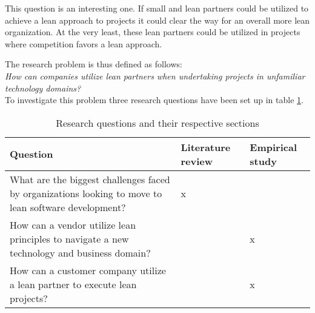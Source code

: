 This question is an interesting one. If small and lean partners could be utilized to achieve a lean approach to projects it could clear the way for an overall more lean organization. At the very least, these lean partners could be utilized in projects where competition favors a lean approach.

The research problem is thus defined as follows:\\

\textit{How can companies utilize lean partners when undertaking projects in unfamiliar technology domains?}\\

To investigate this problem three research questions have been set up in table \ref{tbl:questions}.


\begin{table}
  \begin{tabular}{p{200pt} | p{70pt} | p{70pt}}
    Question & Literature review & Empirical study \\
    \hline
    What are the biggest challenges faced by organizations looking to move to lean software development? & x & \\
    How can a vendor utilize lean principles to navigate a new technology and business domain? &  & x \\
    How can a customer company utilize a lean partner to execute lean projects? &  & x \\
  \end{tabular}
  \caption{Research questions and their respective sections}
  \label{tbl:questions}
\end{table}